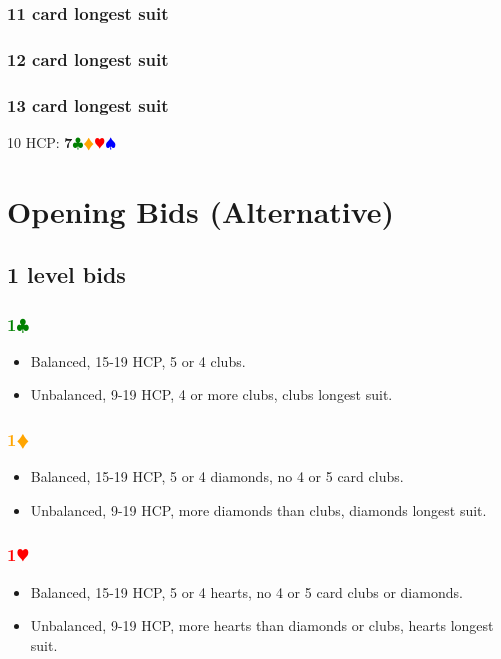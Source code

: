 \documentclass{article}
\newcommand{\Hs}{\textcolor{Red}{$\varheart$}}
\newcommand{\Ss}{\textcolor{Blue}{$\spadesuit$}}
\newcommand{\Ds}{\textcolor{Orange}{$\vardiamond$}}
\newcommand{\Cs}{\textcolor{Green}{$\clubsuit$}}
\renewcommand{\H}[1]{\textcolor{Red}{\textbf{#1}\Hs}}
\newcommand{\D}[1]{\textcolor{Orange}{\textbf{#1}\Ds}}
\newcommand{\C}[1]{\textcolor{Green}{\textbf{#1}\Cs}}
\newcommand{\suits}[1]{\textbf{#1}\Cs\Ds\Hs\Ss}
\begin{document}
\subsubsection{11 card longest suit}
\subsubsection{12 card longest suit}
\subsubsection{13 card longest suit}
10 HCP: \suits{7}

\section{Opening Bids (Alternative)}

\subsection{1 level bids}

\subsubsection{\C{1}}
\begin{itemize}
\item Balanced, 15-19 HCP, 5 or 4 clubs.
\item Unbalanced, 9-19 HCP, 4 or more clubs, clubs longest suit.
\end{itemize}

\subsubsection{\D{1}}
\begin{itemize}
\item Balanced, 15-19 HCP, 5 or 4 diamonds, no 4 or 5 card clubs.
\item Unbalanced, 9-19 HCP, more diamonds than clubs, diamonds longest suit.
\end{itemize} 

\subsubsection{\H{1}}

\begin{itemize}
\item Balanced, 15-19 HCP, 5 or 4 hearts, no 4 or 5 card clubs or diamonds.
\item Unbalanced, 9-19 HCP, more hearts than diamonds or clubs, hearts longest suit.
\end{itemize}
\end{document}
